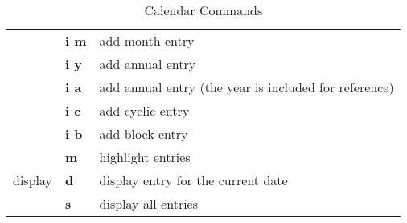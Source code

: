 \begin{table}[H]
\begin{tabular}{l>{\bfseries}ll}
                 & i m & add month entry\\
                 & i y & add annual entry\\
                 & i a & add annual entry (the year is included for reference)\\
                 & i c & add cyclic entry\\
                 & i b & add block entry\\
    \midrule
    \multirow{3}{*}{display} & m & highlight entries\\
                 & d & display entry for the current date\\
                 & s & display all entries\\
    \bottomrule
  \end{tabular}
  \caption{Calendar Commands}
  \label{tab:calendar-commands}
\end{table}








